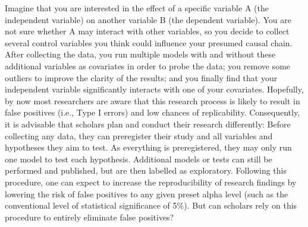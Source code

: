 Imagine that you are interested in the effect of a specific variable A (the independent variable) on another variable B (the dependent variable). You are not sure whether A may interact with other variables, so you decide to collect several control variables you think could influence your presumed causal chain. After collecting the data, you run multiple models with and without these additional variables as covariates in order to probe the data; you remove some outliers to improve the clarity of the results; and you finally find that your independent variable significantly interacts with one of your covariates. Hopefully, by now most researchers are aware that this research process is likely to result in false positives (i.e., Type I errors) and low chances of replicability. Consequently, it is advisable that scholars plan and conduct their research differently: Before collecting any data, they can preregister their study and all variables and hypotheses they aim to test. As everything is preregistered, they may only run one model to test each hypothesis. Additional models or tests can still be performed and published, but are then labelled as exploratory. Following this procedure, one can expect to increase the reproducibility of research findings by lowering the risk of false positives to any given preset alpha level (such as the conventional level of statistical significance of 5\%). But can scholars rely on this procedure to entirely eliminate false positives? \\

